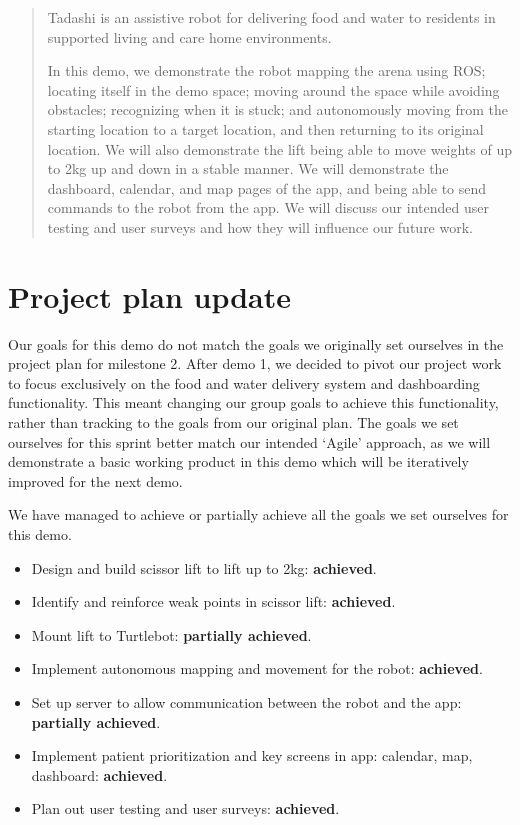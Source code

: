 \documentclass{article}
\begin{document}
 


\begin{abstract}
  Tadashi is an assistive robot for delivering food and water to residents in supported living and care home environments.

  In this demo, we demonstrate the robot mapping the arena using ROS; locating itself in the demo space; moving around the space while avoiding obstacles; recognizing when it is stuck; and autonomously moving from the starting location to a target location, and then returning to its original location. We will also demonstrate the lift being able to move weights of up to 2kg up and down in a stable manner. We will demonstrate the dashboard, calendar, and map pages of the app, and being able to send commands to the robot from the app. We will discuss our intended user testing and user surveys and how they will influence our future work.
\end{abstract} 

\section{Project plan update}
Our goals for this demo do not match the goals we originally set ourselves in the project plan for milestone 2. After demo 1, we decided to pivot our project work to focus exclusively on the food and water delivery system and dashboarding functionality. This meant changing our group goals to achieve this functionality, rather than tracking to the goals from our original plan. The goals we set ourselves for this sprint better match our intended `Agile' approach, as we will demonstrate a basic working product in this demo which will be iteratively improved for the next demo.

We have managed to achieve or partially achieve all the goals we set ourselves for this demo.
\begin{itemize}
\item Design and build scissor lift to lift up to 2kg: {\bf achieved}.
\item Identify and reinforce weak points in scissor lift: {\bf achieved}.
\item Mount lift to Turtlebot: {\bf partially achieved}.
\item Implement autonomous mapping and movement for the robot: {\bf achieved}.
\item Set up server to allow communication between the robot and the app: {\bf partially achieved}. 
\item Implement patient prioritization and key screens in app: calendar, map, dashboard: {\bf achieved}.
\item Plan out user testing and user surveys: {\bf achieved}.
\end{itemize}
\end{document}
